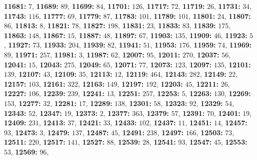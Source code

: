 \textsf{\bfseries 11681:} $7$, \textsf{\bfseries 11689:} $89$, \textsf{\bfseries 11699:} $84$, \textsf{\bfseries 11701:} $126$, \textsf{\bfseries 11717:} $72$, \textsf{\bfseries 11719:} $26$, \textsf{\bfseries 11731:} $34$, \textsf{\bfseries 11743:} $116$, \textsf{\bfseries 11777:} $69$, \textsf{\bfseries 11779:} $87$, \textsf{\bfseries 11783:} $101$, \textsf{\bfseries 11789:} $101$, \textsf{\bfseries 11801:} $24$, \textsf{\bfseries 11807:} $86$, \textsf{\bfseries 11813:} $8$, \textsf{\bfseries 11821:} $78$, \textsf{\bfseries 11827:} $198$, \textsf{\bfseries 11831:} $23$, \textsf{\bfseries 11833:} $83$, \textsf{\bfseries 11839:} $175$, \textsf{\bfseries 11863:} $148$, \textsf{\bfseries 11867:} $15$, \textsf{\bfseries 11887:} $48$, \textsf{\bfseries 11897:} $67$, \textsf{\bfseries 11903:} $135$, \textsf{\bfseries 11909:} $46$, \textsf{\bfseries 11923:} $5$, \textsf{\bfseries 11927:} $73$, \textsf{\bfseries 11933:} $204$, \textsf{\bfseries 11939:} $82$, \textsf{\bfseries 11941:} $51$, \textsf{\bfseries 11953:} $176$, \textsf{\bfseries 11959:} $74$, \textsf{\bfseries 11969:} $89$, \textsf{\bfseries 11971:} $257$, \textsf{\bfseries 11981:} $3$, \textsf{\bfseries 11987:} $62$, \textsf{\bfseries 12007:} $95$, \textsf{\bfseries 12011:} $270$, \textsf{\bfseries 12037:} $56$, \textsf{\bfseries 12041:} $15$, \textsf{\bfseries 12043:} $275$, \textsf{\bfseries 12049:} $65$, \textsf{\bfseries 12071:} $77$, \textsf{\bfseries 12073:} $123$, \textsf{\bfseries 12097:} $135$, \textsf{\bfseries 12101:} $139$, \textsf{\bfseries 12107:} $43$, \textsf{\bfseries 12109:} $35$, \textsf{\bfseries 12113:} $12$, \textsf{\bfseries 12119:} $464$, \textsf{\bfseries 12143:} $282$, \textsf{\bfseries 12149:} $22$, \textsf{\bfseries 12157:} $103$, \textsf{\bfseries 12161:} $322$, \textsf{\bfseries 12163:} $149$, \textsf{\bfseries 12197:} $192$, \textsf{\bfseries 12203:} $45$, \textsf{\bfseries 12211:} $26$, \textsf{\bfseries 12227:} $106$, \textsf{\bfseries 12239:} $239$, \textsf{\bfseries 12241:} $13$, \textsf{\bfseries 12251:} $257$, \textsf{\bfseries 12253:} $5$, \textsf{\bfseries 12263:} $130$, \textsf{\bfseries 12269:} $153$, \textsf{\bfseries 12277:} $32$, \textsf{\bfseries 12281:} $17$, \textsf{\bfseries 12289:} $138$, \textsf{\bfseries 12301:} $58$, \textsf{\bfseries 12323:} $92$, \textsf{\bfseries 12329:} $54$, \textsf{\bfseries 12343:} $52$, \textsf{\bfseries 12347:} $19$, \textsf{\bfseries 12373:} $2$, \textsf{\bfseries 12377:} $363$, \textsf{\bfseries 12379:} $57$, \textsf{\bfseries 12391:} $70$, \textsf{\bfseries 12401:} $19$, \textsf{\bfseries 12409:} $231$, \textsf{\bfseries 12413:} $37$, \textsf{\bfseries 12421:} $33$, \textsf{\bfseries 12433:} $102$, \textsf{\bfseries 12437:} $11$, \textsf{\bfseries 12451:} $14$, \textsf{\bfseries 12457:} $93$, \textsf{\bfseries 12473:} $3$, \textsf{\bfseries 12479:} $137$, \textsf{\bfseries 12487:} $45$, \textsf{\bfseries 12491:} $238$, \textsf{\bfseries 12497:} $166$, \textsf{\bfseries 12503:} $73$, \textsf{\bfseries 12511:} $220$, \textsf{\bfseries 12517:} $141$, \textsf{\bfseries 12527:} $88$, \textsf{\bfseries 12539:} $28$, \textsf{\bfseries 12541:} $93$, \textsf{\bfseries 12547:} $45$, \textsf{\bfseries 12553:} $53$, \textsf{\bfseries 12569:} $96$, 
